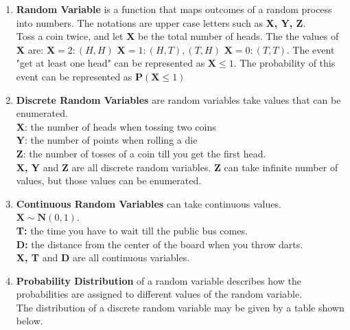 \documentclass[a4paper, 12pt,twoside]{book}
\begin{document}
\begin{enumerate}[(1)]
    \item \textbf{Random Variable} is a function that maps outcomes of a random process into numbers. The notations are upper case letters such as \textbf{X, Y, Z}.
    \vspace{0.3cm}\\
    Toss a coin twice, and let \textbf{X} be the total number of heads. The the values of \textbf{X} are: 
     $\textbf{X} = 2: (H, H)$   
   \hspace{0.6cm} $\textbf{X} = 1: (H, T), (T, H)$   
    \hspace{0.6cm} $\textbf{X} = 0: (T, T)$. The event "get at least one head" can be represented as $\textbf{X} \leq 1$. The probability of this event can be represented as $\textbf{P}(\textbf{X} \leq 1)$
    \vspace{0.3cm}
    \item \textbf{Discrete Random Variables} are random variables take values that can be enumerated. 
    \vspace{0.3cm}\\
    \textbf{X}: the number of heads when tossing two coins\\
    \textbf{Y}: the number of points when rolling a die\\
    \textbf{Z}: the number of tosses of a coin till you get the first head.
    \vspace{0.3cm}\\
    \textbf{X, Y} and \textbf{Z} are all discrete random variables.
      \textbf{Z} can take infinite number of values, but those values can be enumerated.
    \vspace{0.3cm}
    
 \item \textbf{Continuous Random Variables} can take continuous values.
 \vspace{0.3cm}\\
 $\textbf{X}\sim \textbf{N}(0, 1)$.\\
 \textbf{T:} the time you have to wait till the public bus comes.\\
 \textbf{D:} the distance from the center of the board when you throw darts.
 \vspace{0.3cm}\\
 \textbf{X, T} and \textbf{D} are all continuous variables.
 \vspace{0.3cm}
 
 \item \textbf{Probability Distribution} of a random variable describes how the probabilities are assigned to different values of the random variable. 
 \vspace{0.3cm}\\
 The distribution of a discrete random variable may be given by a table shown below.
 

\end{enumerate}
\end{document}
